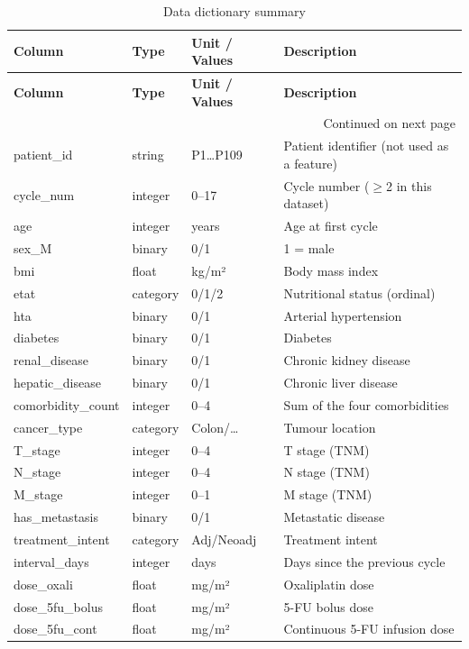 \documentclass[12pt,a4paper]{report}
\begin{document}
\begin{longtable}{p{3.5cm}p{1.5cm}p{2.5cm}p{5.5cm}}
\caption{Data dictionary summary} \label{tab:dict} \\
\toprule
\textbf{Column} & \textbf{Type} & \textbf{Unit / Values} & \textbf{Description} \\
\midrule
\endfirsthead
\toprule \textbf{Column} & \textbf{Type} & \textbf{Unit / Values} & \textbf{Description} \\ \midrule
\endhead
\midrule \multicolumn{4}{r}{\small Continued on next page} \\
\endfoot
\bottomrule
\endlastfoot
patient\_id & string & P1\ldots P109 & Patient identifier (not used as a feature) \\
cycle\_num & integer & 0--17 & Cycle number ($\geq$2 in this dataset) \\
age & integer & years & Age at first cycle \\
sex\_M & binary & 0/1 & 1 = male \\
bmi & float & kg/m² & Body mass index \\
etat & category & 0/1/2 & Nutritional status (ordinal) \\
hta & binary & 0/1 & Arterial hypertension \\
diabetes & binary & 0/1 & Diabetes \\
renal\_disease & binary & 0/1 & Chronic kidney disease \\
hepatic\_disease & binary & 0/1 & Chronic liver disease \\
comorbidity\_count & integer & 0--4 & Sum of the four comorbidities \\
cancer\_type & category & Colon/\ldots & Tumour location \\
T\_stage & integer & 0--4 & T stage (TNM) \\
N\_stage & integer & 0--4 & N stage (TNM) \\
M\_stage & integer & 0--1 & M stage (TNM) \\
has\_metastasis & binary & 0/1 & Metastatic disease \\
treatment\_intent & category & Adj/Neoadj & Treatment intent \\
interval\_days & integer & days & Days since the previous cycle \\
dose\_oxali & float & mg/m² & Oxaliplatin dose \\
dose\_5fu\_bolus & float & mg/m² & 5-FU bolus dose \\
dose\_5fu\_cont & float & mg/m² & Continuous 5-FU infusion dose \\

\end{longtable}
\end{document}
